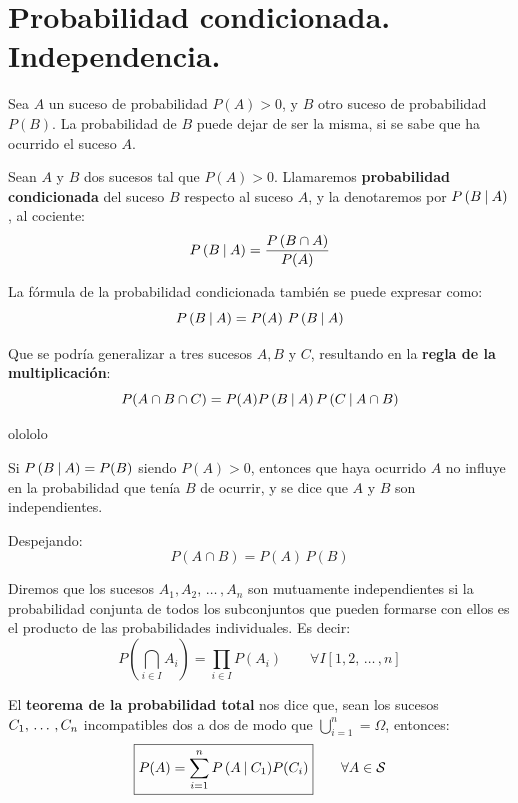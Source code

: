 \documentclass[a4paper]{book}
\begin{document}
\section{Probabilidad condicionada. Independencia.}
\begin{definicion}
	Sea $A$ un suceso de probabilidad $P(A)>0$, y $B$ otro suceso de probabilidad $P(B)$. La probabilidad de $B$ puede dejar de ser la misma, si se sabe que ha ocurrido el suceso $A$.

	Sean $A$ y $B$ dos sucesos tal que $P(A)>0$. Llamaremos \textbf{probabilidad condicionada} del suceso $B$ respecto al suceso $A$, y la denotaremos por $P \left( B \: \middle\vert\: A \right)$, al cociente: \[ P \left( B \: \middle\vert\: A \right)  = \frac{P\left(  B\cap A\right)}{P(A)}\]

	La fórmula de la probabilidad condicionada también se puede expresar como: \[\probCond{B}{A} = P(A)\ \probCond{B}{A} \]

	Que se podría generalizar a tres sucesos $A, B$ y $C$, resultando en la \textbf{regla de la multiplicación}: \[P(A\cap B \cap C)=P(A)P \left( B \: \middle\vert\: A \right)P \left( C \: \middle\vert\: A\cap B \right)\]

	olololo
\end{definicion}

\begin{definicion}
	Si $P \left( B \: \middle\vert\: A \right) =P(B)$ siendo $P(A)>0$, entonces que haya ocurrido $A$ no influye en la probabilidad que tenía $B$ de ocurrir, y se dice que $A$ y $B$ son independientes.

	Despejando: \[P(A\cap B) = P(A)\, P(B)\]
\end{definicion}

\begin{definicion}
	Diremos que los sucesos $A_1,A_2,\, \ldots\, ,A_n$ son mutuamente independientes si la probabilidad conjunta de todos los subconjuntos que pueden formarse con ellos es el producto de las probabilidades individuales. Es decir: \[P\left( \bigcap_{i\in I} A_i \right) = \prod_{i\in I}{P(A_i)} \qquad \forall I \left[ 1, 2, \, \ldots	\, ,n \right] \]
\end{definicion}

\begin{teorema}
	El \textbf{teorema de la probabilidad total} nos dice que, sean los sucesos\\ $C_1, \, \ldots \, ,C_n$ incompatibles dos a dos de modo que $\bigcup^{n}_{i=1}=\Omega$, entonces:
	\[\boxed{P(A)=\sum^{n}_{i=1}{P \left( A \: \middle\vert\: C_1 \right)}P(C_i)}\qquad  \forall A \in \mathcal{S}\]
\end{teorema}
\end{document}
